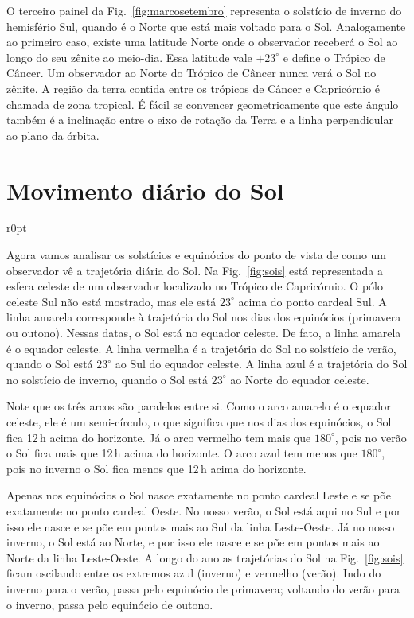 O terceiro painel da Fig.~\ref{fig:marcosetembro} representa o solstício de inverno do hemisfério Sul, quando é o Norte que está mais voltado para o Sol. Analogamente ao primeiro caso, existe uma latitude Norte onde o observador receberá o Sol ao longo do seu zênite ao meio-dia. Essa latitude vale $+23^{\circ}$ e define o Trópico de Câncer. Um observador ao Norte do Trópico de Câncer nunca verá o Sol no zênite. A região da terra contida entre os trópicos de Câncer e Capricórnio é chamada de zona tropical. É fácil se convencer geometricamente que este ângulo também é a inclinação entre o eixo de rotação da Terra e a linha perpendicular ao plano da órbita.

\section{Movimento diário do Sol}

\begin{wrapfigure}{r}{0pt}

\caption{Trajetórias do Sol no solstício de verão (vermelho), equinócios (amarelo) e solstício de inverno (azul).}
\label{fig:sois}
\end{wrapfigure}

Agora vamos analisar os solstícios e equinócios do ponto de vista de como um observador vê a trajetória diária do Sol. Na Fig.~\ref{fig:sois} está representada a esfera celeste de um observador localizado no Trópico de Capricórnio. O pólo celeste Sul não está mostrado, mas ele está $23^{\circ}$ acima do ponto cardeal Sul. A linha amarela corresponde à trajetória do Sol nos dias dos equinócios (primavera ou outono). Nessas datas, o Sol está no equador celeste. De fato, a linha amarela é o equador celeste. A linha vermelha é a trajetória do Sol no solstício de verão, quando o Sol está $23^{\circ}$ ao Sul do equador celeste. A linha azul é a trajetória do Sol no solstício de inverno, quando o Sol está $23^{\circ}$ ao Norte do equador celeste.

Note que os três arcos são paralelos entre si. Como o arco amarelo é o equador celeste, ele é um semi-círculo, o que significa que nos dias dos equinócios, o Sol fica 12\,h acima do horizonte. Já o arco vermelho tem mais que $180^{\circ}$, pois no verão o Sol fica mais que 12\,h acima do horizonte. O arco azul tem menos que $180^{\circ}$, pois no inverno o Sol fica menos que 12\,h acima do horizonte.

Apenas nos equinócios o Sol nasce exatamente no ponto cardeal Leste e se põe exatamente no ponto cardeal Oeste. No nosso verão, o Sol está aqui no Sul e por isso ele nasce e se põe em pontos mais ao Sul da linha Leste-Oeste. Já no nosso inverno, o Sol está ao Norte, e por isso ele nasce e se põe em pontos mais ao Norte da linha Leste-Oeste. A longo do ano as trajetórias do Sol na Fig.~\ref{fig:sois} ficam oscilando entre os extremos azul (inverno) e vermelho (verão). Indo do inverno para o verão, passa pelo equinócio de primavera; voltando do verão para o inverno, passa pelo equinócio de outono.

